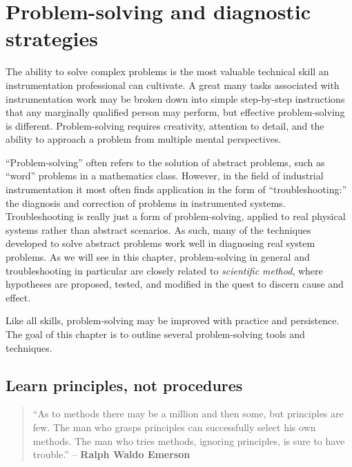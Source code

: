 
\chapter{Problem-solving and diagnostic strategies}

The ability to solve complex problems is the most valuable technical skill an instrumentation professional can cultivate.  A great many tasks associated with instrumentation work may be broken down into simple step-by-step instructions that any marginally qualified person may perform, but effective problem-solving is different.  Problem-solving requires creativity, attention to detail, and the ability to approach a problem from multiple mental perspectives.

``Problem-solving'' often refers to the solution of abstract problems, such as ``word'' problems in a mathematics class.  However, in the field of industrial instrumentation it most often finds application in the form of ``troubleshooting:'' the diagnosis and correction of problems in instrumented systems.  Troubleshooting is really just a form of problem-solving, applied to real physical systems rather than abstract scenarios.  As such, many of the techniques developed to solve abstract problems work well in diagnosing real system problems.  As we will see in this chapter, problem-solving in general and troubleshooting in particular are closely related to \textit{scientific method}, where hypotheses are proposed, tested, and modified in the quest to discern cause and effect.

Like all skills, problem-solving may be improved with practice and persistence.  The goal of this chapter is to outline several problem-solving tools and techniques.








\filbreak
\section{Learn principles, not procedures}

\begin{quote}

``As to methods there may be a million and then some, but principles are few.  The man who grasps principles can successfully select his own methods.  The man who tries methods, ignoring principles, is sure to have trouble.'' -- \textbf{Ralph Waldo Emerson}  

\end{quote}

